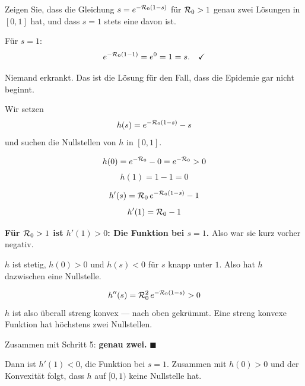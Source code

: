 \begin{aufgabe}
Zeigen Sie, dass die Gleichung $s = e^{-\mathcal{R}_0(1-s)}$ für $\mathcal{R}_0 > 1$ genau zwei Lösungen in $[0,1]$ hat, und dass $s = 1$ stets eine davon ist.

\loesung
{}
Für $s = 1$:
\[ e^{-\mathcal{R}_0(1-1)} = e^{0} = 1 = s . \quad \checkmark \]

 Niemand erkrankt. Das ist die Lösung für den Fall, dass die Epidemie gar nicht beginnt.

Wir setzen
\[ h(s) = e^{-\mathcal{R}_0(1-s)} - s \]
und suchen die Nullstellen von $h$ in $[0,1]$.

\[ h(0) = e^{-\mathcal{R}_0} - 0 = e^{-\mathcal{R}_0} > 0 \]
\[ h(1) = 1 - 1 = 0 \]

\[ h'(s) = \mathcal{R}_0\,e^{-\mathcal{R}_0(1-s)} - 1 \]
\[ h'(1) = \mathcal{R}_0 - 1 \]

\begin{center}
\begin{minipage}{0.9\textwidth}
\textbf{Für $\mathcal{R}_0 > 1$ ist $h'(1) > 0$: Die Funktion  bei $s=1$.} Also war sie kurz vorher negativ.
\end{minipage}
\end{center}

$h$ ist stetig, $h(0) > 0$ und $h(s) < 0$ für $s$ knapp unter $1$. Also hat $h$ dazwischen eine Nullstelle.

\begin{center}
\begin{minipage}{0.88\textwidth}
\end{minipage}
\end{center}

\[ h''(s) = \mathcal{R}_0^2\,e^{-\mathcal{R}_0(1-s)} > 0 \]
$h$ ist also überall streng konvex --- nach oben gekrümmt. Eine streng konvexe Funktion hat höchstens zwei Nullstellen.

Zusammen mit Schritt 5: \textbf{genau zwei.} $\blacksquare$

Dann ist $h'(1) < 0$, die Funktion  bei $s=1$. Zusammen mit $h(0)>0$ und der Konvexität folgt, dass $h$ auf $[0,1)$ keine Nullstelle hat.


\end{aufgabe}
